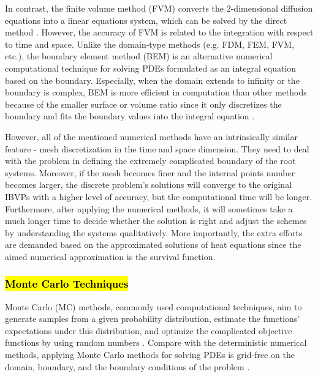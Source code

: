In contrast, the finite volume method (FVM) converts the
$2$-dimensional diffusion equations into a linear equations system,
which can be solved by the direct method
\cite{eymard2000finite}. However, the accuracy of FVM is related to
the integration with respect to time and space. Unlike the domain-type
methods (e.g. FDM, FEM, FVM, etc.), the boundary element method (BEM)
is an alternative numerical computational technique for solving PDEs
formulated as an integral equation based on the boundary. Especially,
when the domain extends to infinity or the boundary is complex, BEM is
more efficient in computation than other methods because of the
smaller surface or volume ratio \cite{katsikadelis2002boundary} since
it only discretizes the boundary and fits the boundary values into the
integral equation \cite{ang2007beginner}.


However, all of the mentioned numerical methods have an intrinsically
similar feature - mesh discretization in the time and space
dimension. They need to deal with the problem in defining the
extremely complicated boundary of the root systems. Moreover, if the
mesh becomes finer and the internal points number becomes larger, the
discrete problem's solutions will converge to the original IBVPs with
a higher level of accuracy, but the computational time will be
longer. Furthermore, after applying the numerical methods, it will
sometimes take a much longer time to decide whether the solution is
right and adjust the schemes by understanding the systems
qualitatively. More importantly, the extra efforts are demanded based
on the approximated solutions of heat equations since the aimed
numerical approximation is the survival function.




\subsubsection{\textcolor{red}{\textbf{\hl{Monte Carlo Techniques}}}}


Monte Carlo (MC) methods, commonly used computational techniques, aim
to generate samples from a given probability distribution, estimate
the functions' expectations under this distribution, and optimize the
complicated objective functions by using random numbers
\cite{kroese2014monte}. Compare with the deterministic numerical
methods, applying Monte Carlo methods for solving PDEs is grid-free on
the domain, boundary, and the boundary conditions of the problem
\cite{grebenkov2014efficient}.

